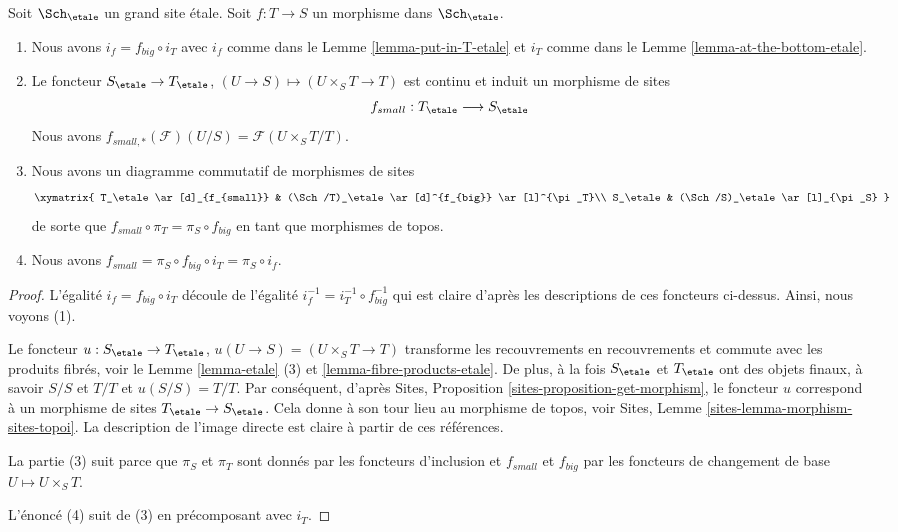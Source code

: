\begin{lemma}
\label{lemma-morphism-big-small-etale}
Soit $\Sch_\etale$ un grand site étale. Soit $f : T \to S$ un morphisme dans $\Sch_\etale$.
\begin{enumerate}
\item Nous avons $i_f = f_{big} \circ i_T$ avec $i_f$ comme dans le Lemme \ref{lemma-put-in-T-etale} et $i_T$ comme dans le Lemme \ref{lemma-at-the-bottom-etale}.
\item Le foncteur $S_\etale \to T_\etale$, $(U \to S) \mapsto (U \times_S T \to T)$ est continu et induit un morphisme de sites
$$
f_{small} : T_\etale \longrightarrow S_\etale
$$
Nous avons $f_{small, *}(\mathcal{F})(U/S) = \mathcal{F}(U \times_S T/T)$.
\item Nous avons un diagramme commutatif de morphismes de sites
$$
\xymatrix{
T_\etale \ar[d]_{f_{small}} &
(\Sch/T)_\etale \ar[d]^{f_{big}} \ar[l]^{\pi_T}\\
S_\etale &
(\Sch/S)_\etale \ar[l]_{\pi_S}
}
$$
de sorte que $f_{small} \circ \pi_T = \pi_S \circ f_{big}$ en tant que morphismes de topos.
\item Nous avons $f_{small} = \pi_S \circ f_{big} \circ i_T = \pi_S \circ i_f$.
\end{enumerate}
\end{lemma}

\begin{proof}
L'égalité $i_f = f_{big} \circ i_T$ découle de l'égalité $i_f^{-1} = i_T^{-1} \circ f_{big}^{-1}$ qui est claire d'après les descriptions de ces foncteurs ci-dessus. Ainsi, nous voyons (1).

\medskip\noindent
Le foncteur $u : S_\etale \to T_\etale$, $u(U \to S) = (U \times_S T \to T)$ transforme les recouvrements en recouvrements et commute avec les produits fibrés, voir le Lemme \ref{lemma-etale} (3) et \ref{lemma-fibre-products-etale}. De plus, à la fois $S_\etale$ et $T_\etale$ ont des objets finaux, à savoir $S/S$ et $T/T$ et $u(S/S) = T/T$. Par conséquent, d'après Sites, Proposition \ref{sites-proposition-get-morphism}, le foncteur $u$ correspond à un morphisme de sites $T_\etale \to S_\etale$. Cela donne à son tour lieu au morphisme de topos, voir Sites, Lemme \ref{sites-lemma-morphism-sites-topoi}. La description de l'image directe est claire à partir de ces références.

\medskip\noindent
La partie (3) suit parce que $\pi_S$ et $\pi_T$ sont donnés par les foncteurs d’inclusion et $f_{small}$ et $f_{big}$ par les foncteurs de changement de base $U \mapsto U \times_S T$.

\medskip\noindent
L’énoncé (4) suit de (3) en précomposant avec $i_T$.
\end{proof}

